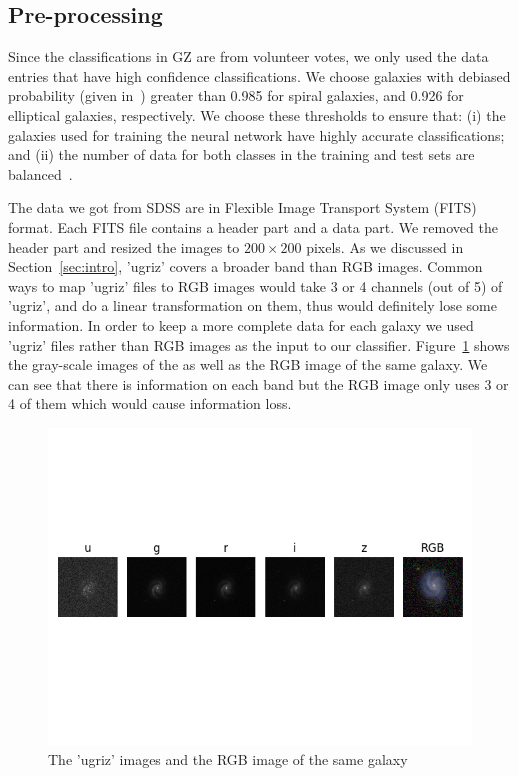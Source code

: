 \subsection{Pre-processing}
Since the classifications in GZ are from volunteer votes, we only used the data entries that
have high confidence classifications. We choose galaxies with debiased probability (given in~\cite{lintott2010galaxy}) greater than 0.985 for spiral galaxies, and 0.926 for elliptical galaxies, respectively. 
We choose these thresholds to ensure that: (i) the galaxies used for training the neural network have highly accurate classifications; and (ii) the number of data for both classes in the training and test sets are balanced~\cite{khan2019deep}. 

The data we got from SDSS are in Flexible Image Transport System (FITS) format. 
Each FITS file contains a header part and a data part. We removed the header part and resized the images to $200 \times 200$ pixels. As we discussed in Section~\ref{sec:intro}, 'ugriz' covers a broader band than RGB images. Common ways to map 'ugriz' files to RGB images would take 3 or 4 channels (out of 5) of 'ugriz', and do a linear transformation on them, thus would definitely lose some information. 
In order to keep a more complete data for each galaxy we used 'ugriz' files rather than RGB images as the input to our classifier. Figure~\ref{fig:ugriz} shows the gray-scale images of the  as well as the RGB image of the same galaxy. We can see that there is information on each band but the RGB image only uses 3 or 4 of them which would cause information loss.

\begin{figure}[h]
	\centering
	\captionsetup{justification=centering}
	\includegraphics[trim={0 4cm 0 4cm},clip]{Figures/ugriz_vs_rgb.png}
	\caption{The 'ugriz' images and the RGB image of the same galaxy}
	\label{fig:ugriz}
\end{figure}

